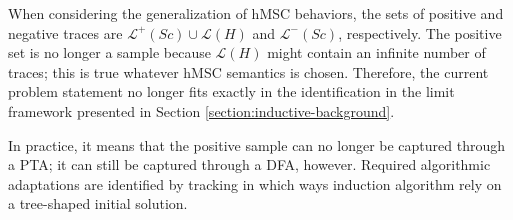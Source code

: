 When considering the generalization of hMSC behaviors, the sets of positive and negative traces are $\mathcal{L}^+(Sc) \cup \mathcal{L}(H)$ and $\mathcal{L}^-(Sc)$, respectively. The positive set is no longer a sample because $\mathcal{L}(H)$ might contain an infinite number of traces; this is true whatever hMSC semantics is chosen. Therefore, the current problem statement no longer fits exactly in the identification in the limit framework presented in Section \ref{section:inductive-background}.

In practice, it means that the positive sample can no longer be captured through a PTA; it can still be captured through a DFA, however. Required algorithmic adaptations are identified by tracking in which ways induction algorithm rely on a tree-shaped initial solution.

  
